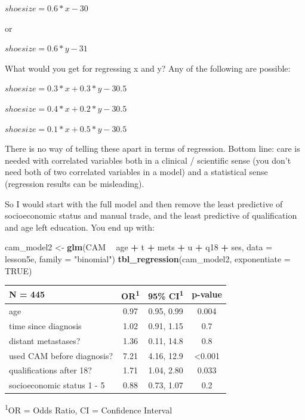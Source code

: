 \documentclass[]{book}
\newenvironment{Shaded}{\begin{snugshade}}{\end{snugshade}}
\newcommand{\DataTypeTok}[1]{\textcolor[rgb]{0.13,0.29,0.53}{#1}}
\newcommand{\KeywordTok}[1]{\textcolor[rgb]{0.13,0.29,0.53}{\textbf{#1}}}
\newcommand{\NormalTok}[1]{#1}
\newcommand{\OperatorTok}[1]{\textcolor[rgb]{0.81,0.36,0.00}{\textbf{#1}}}
\newcommand{\OtherTok}[1]{\textcolor[rgb]{0.56,0.35,0.01}{#1}}
\newcommand{\StringTok}[1]{\textcolor[rgb]{0.31,0.60,0.02}{#1}}
\begin{document}
\(shoesize = 0.6*x - 30\)

or

\(shoesize = 0.6*y - 31\)

What would you get for regressing x and y? Any of the following are
possible:

\(shoesize = 0.3*x + 0.3*y - 30.5\)

\(shoesize = 0.4*x + 0.2*y - 30.5\)

\(shoesize = 0.1*x + 0.5*y - 30.5\)

There is no way of telling these apart in terms of regression. Bottom
line: care is needed with correlated variables both in a clinical /
scientific sense (you don't need both of two correlated variables in a
model) and a statistical sense (regression results can be misleading).

So I would start with the full model and then remove the least
predictive of socioeconomic status and manual trade, and the least
predictive of qualification and age left education. You end up with:

\begin{Shaded}
\begin{Highlighting}[]
\NormalTok{cam_model2 <-}\StringTok{ }\KeywordTok{glm}\NormalTok{(CAM }\OperatorTok{~}\StringTok{ }\NormalTok{age }\OperatorTok{+}\StringTok{ }\NormalTok{t }\OperatorTok{+}\StringTok{ }\NormalTok{mets }\OperatorTok{+}\StringTok{ }\NormalTok{u }\OperatorTok{+}\StringTok{ }\NormalTok{q18 }\OperatorTok{+}\StringTok{ }\NormalTok{ses,}
                  \DataTypeTok{data =}\NormalTok{ lesson5e,}
                  \DataTypeTok{family =} \StringTok{"binomial"}\NormalTok{)}
\KeywordTok{tbl_regression}\NormalTok{(cam_model2, }\DataTypeTok{exponentiate =} \OtherTok{TRUE}\NormalTok{)}
\end{Highlighting}
\end{Shaded}

\captionsetup[table]{labelformat=empty,skip=1pt}
\begin{longtable}{lccc}
\toprule
\textbf{N = 445} & \textbf{OR}\textsuperscript{1} & \textbf{95\% CI}\textsuperscript{1} & \textbf{p-value} \\ 
\midrule
age & 0.97 & 0.95, 0.99 & 0.004 \\ 
time since diagnosis & 1.02 & 0.91, 1.15 & 0.7 \\ 
distant metastases? & 1.36 & 0.11, 14.8 & 0.8 \\ 
used CAM before diagnosis? & 7.21 & 4.16, 12.9 & <0.001 \\ 
qualifications after 18? & 1.71 & 1.04, 2.80 & 0.033 \\ 
socioeconomic status 1 - 5 & 0.88 & 0.73, 1.07 & 0.2 \\ 
\bottomrule
\end{longtable}
\vspace{-5mm}
\begin{minipage}{\linewidth}
\textsuperscript{1}OR = Odds Ratio, CI = Confidence Interval \\ 
\end{minipage}
\end{document}
